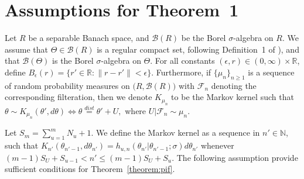 \section{Assumptions for Theorem~1}\label{sec:assumptions}

Let $R$ be a separable Banach space, and $\mathcal{B}(R)$ be the Borel $\sigma$-algebra on $R$. We assume that $\Theta \in \mathcal{B}(R)$ is a regular compact set, following Definition~1 of \citet{chen24}), and that $\mathcal{B}(\Theta)$ is the Borel $\sigma$-algebra on $\Theta$.
For all constants $(\epsilon, r) \in (0, \infty) \times \mathbb{R}$, define $B_\epsilon(r) = \{r' \in \mathbb{R}: \|r - r'\| < \epsilon\}$.
Furthermore, if $\{\mu_n\}_{n \geq 1}$ is a sequence of random probability measures on $\big(R, \mathcal{B}(R)\big)$ with $\mathcal{F}_n$ denoting the corresponding filteration, then we denote $K_{\mu_n}$ to be the Markov kernel such that $\theta \sim K_{\mu_n}(\theta', d\theta) \iff \theta \overset{dist}{=}\theta' + U,$ where $U|\mathcal{F}_n \sim \mu_n$.

Let $S_m = \sum_{u = 1}^m N_u + 1$. 
We define the Markov kernel as a sequence in $n' \in \mathbb{N}$, such that $K_{n'}(\theta_{n'-1}, d\theta_{n'}) = h_{u, n}(\theta_{n'}|\theta_{n'-1};\sigma)d\theta_{n'}$ whenever $(m-1)S_U + S_{u-1} < n' \leq (m-1)S_U + S_{u}$.
The following assumption provide sufficient conditions for Theorem~\ref{theorem:pif}. 

